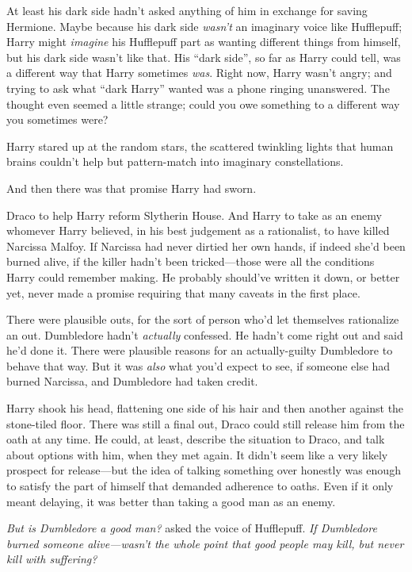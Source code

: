 At least his dark side hadn’t asked anything of him in exchange for saving Hermione. Maybe because his dark side \emph{wasn’t} an imaginary voice like Hufflepuff; Harry might \emph{imagine} his Hufflepuff part as wanting different things from himself, but his dark side wasn’t like that. His “dark side”, so far as Harry could tell, was a different way that Harry sometimes \emph{was}. Right now, Harry wasn’t angry; and trying to ask what “dark Harry” wanted was a phone ringing unanswered. The thought even seemed a little strange; could you owe something to a different way you sometimes were?

Harry stared up at the random stars, the scattered twinkling lights that human brains couldn’t help but pattern-match into imaginary constellations.

And then there was that promise Harry had sworn.

Draco to help Harry reform Slytherin House. And Harry to take as an enemy whomever Harry believed, in his best judgement as a rationalist, to have killed Narcissa Malfoy. If Narcissa had never dirtied her own hands, if indeed she’d been burned alive, if the killer hadn’t been tricked—those were all the conditions Harry could remember making. He probably should’ve written it down, or better yet, never made a promise requiring that many caveats in the first place.

There were plausible outs, for the sort of person who’d let themselves rationalize an out. Dumbledore hadn’t \emph{actually} confessed. He hadn’t come right out and said he’d done it. There were plausible reasons for an actually-guilty Dumbledore to behave that way. But it was \emph{also} what you’d expect to see, if someone else had burned Narcissa, and Dumbledore had taken credit.

Harry shook his head, flattening one side of his hair and then another against the stone-tiled floor. There was still a final out, Draco could still release him from the oath at any time. He could, at least, describe the situation to Draco, and talk about options with him, when they met again. It didn’t seem like a very likely prospect for release—but the idea of talking something over honestly was enough to satisfy the part of himself that demanded adherence to oaths. Even if it only meant delaying, it was better than taking a good man as an enemy.

\emph{But \emph{is} Dumbledore a good man?} asked the voice of Hufflepuff. \emph{If Dumbledore burned someone alive—wasn’t the whole point that good people may kill, but never kill with suffering?}

